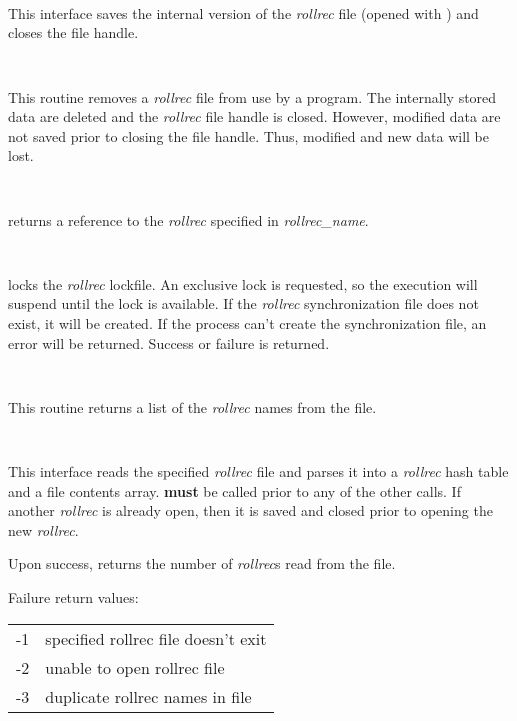 \begin{description}
\item {}\verb" "

This interface saves the internal version of the {\it rollrec} file (opened
with ) and closes the file handle.

\item {}\verb" "

This routine removes a {\it rollrec} file from use by a program.  The internally
stored data are deleted and the {\it rollrec} file handle is closed.  However,
modified data are not saved prior to closing the file handle.  Thus, modified
and new data will be lost.

\item {}\verb" "

 returns a reference to the {\it rollrec} specified in
{\it rollrec\_name}.

\item {}\verb" "

 locks the {\it rollrec} lockfile.  An exclusive lock is
requested, so the execution will suspend until the lock is available.  If the
{\it rollrec} synchronization file does not exist, it will be created.  If the
process can't create the synchronization file, an error will be returned.
Success or failure is returned.

\item {}\verb" "

This routine returns a list of the {\it rollrec} names from the file.

\item {}\verb" "

This interface reads the specified {\it rollrec} file and parses it into a
{\it rollrec} hash table and a file contents array.  
{\bf must} be called prior to any of the other
 calls.  If another {\it rollrec} is
already open, then it is saved and closed prior to opening the new
{\it rollrec}.

Upon success,  returns the number of {\it rollrec}s read
from the file.

Failure return values:

\begin{table}[ht]
\begin{center}
\begin{tabular}{cl}
-1 & specified rollrec file doesn't exit	\\
-2 & unable to open rollrec file		\\
-3 & duplicate rollrec names in file		\\
\end{tabular} 
\end{center}
\end{table}


\end{description}
